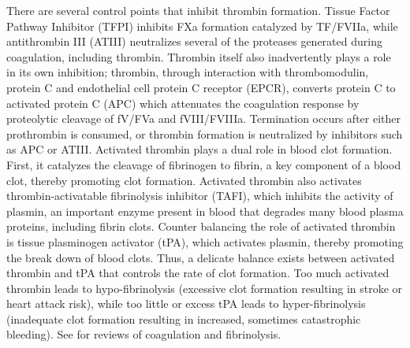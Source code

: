 \documentclass[11pt]{article}
\begin{document}
There are several control points that inhibit thrombin formation.
Tissue Factor Pathway Inhibitor (TFPI) inhibits FXa formation catalyzed by TF/FVIIa, while antithrombin III (ATIII)
neutralizes several of the proteases generated during coagulation, including thrombin.
Thrombin itself also inadvertently plays a role in its own inhibition; thrombin, through interaction with thrombomodulin, protein C and endothelial cell protein C receptor (EPCR),
converts protein C to activated protein C (APC) which attenuates the coagulation response by proteolytic cleavage of fV/FVa and fVIII/FVIIIa.
Termination occurs after either prothrombin is consumed, or thrombin formation is neutralized by inhibitors such as APC or ATIII.
Activated thrombin plays a dual role in blood clot formation.
First, it catalyzes the cleavage of fibrinogen to fibrin, a key component of a blood clot, thereby promoting clot formation.
Activated thrombin also activates thrombin-activatable fibrinolysis inhibitor (TAFI), which inhibits the activity of plasmin, an important enzyme present in blood that degrades many blood plasma proteins, including fibrin clots.
Counter balancing the role of activated thrombin is tissue plasminogen activator (tPA), which activates plasmin, thereby promoting the break down of blood clots.
Thus, a delicate balance exists between activated thrombin and tPA that controls the rate of clot formation.
Too much activated thrombin leads to hypo-fibrinolysis (excessive clot formation resulting in stroke or heart attack risk),
while too little or excess tPA leads to hyper-fibrinolysis (inadequate clot formation resulting in increased, sometimes catastrophic bleeding).
See \cite{Tanaka:2009wo,Chapin:2015aa} for reviews of coagulation and fibrinolysis.
\end{document}
